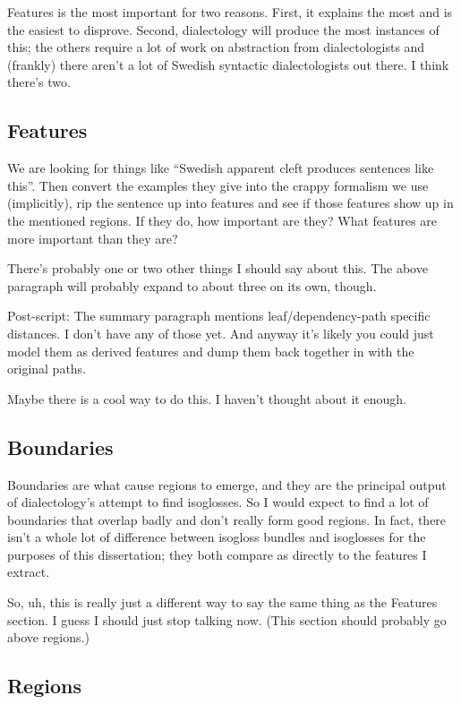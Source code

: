 Features is the most important for two reasons. First, it explains the
most and is the easiest to disprove. Second, dialectology will
produce the most instances of this; the others require a lot of work
on abstraction from dialectologists and (frankly) there aren't a lot
of Swedish syntactic dialectologists out there. I think there's two.

\subsection{Features}

We are looking for things like ``Swedish apparent cleft produces
sentences like this''. Then convert the examples they give into the
crappy formalism we use (implicitly), rip the sentence up into
features and see if those features show up in the mentioned
regions. If they do, how important are they? What features are more
important than they are?

There's probably one or two other things I should say about this. The
above paragraph will probably expand to about three on its own,
though.

Post-script: The summary paragraph mentions leaf/dependency-path
specific distances. I don't have any of those yet. And anyway it's
likely you could just model them as derived features and dump them
back together in with the original paths.

Maybe there is a cool way to do this. I haven't thought about it
enough.

\subsection{Boundaries}

Boundaries are what cause regions to emerge, and they are the
principal output of dialectology's attempt to find isoglosses. So I
would expect to find a lot of boundaries that overlap badly and don't
really form good regions. In fact, there isn't a whole lot of
difference between isogloss bundles and isoglosses for the purposes of
this dissertation; they both compare as directly to the features I
extract.

So, uh, this is really just a different way to say the same thing as
the Features section. I guess I should just stop talking now. (This
section should probably go above regions.)

\subsection{Regions}

